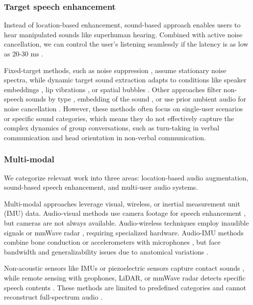 \subsubsection{Target speech enhancement}
Instead of location-based enhancement, sound-based approach enables users to hear manipulated sounds like superhuman hearing. Combined with active noise cancellation, we can control the user's listening seamlessly if the latency is as low as 20-30 ms \cite{stone1999tolerable, gupta2020acoustic}. 

Fixed-target methods, such as noise suppression \cite{wiener1949extrapolation}, assume stationary noise spectra, while dynamic target sound extraction adapts to conditions like speaker embeddings \cite{zmolikova2023neural, veluri2024look}, lip vibrations \cite{liu2021wavoice}, or spatial bubbles \cite{chen2024hearable}. Other approaches filter non-speech sounds by type \cite{veluri2023semantic}, embedding of the sound \cite{liu22w_interspeech}, or use prior ambient audio for noise cancellation \cite{shen2018mute}. 
However, these methods often focus on single-user scenarios or specific sound categories, which means they do not effectively capture the complex dynamics of group conversations, such as turn-taking in verbal communication and head orientation in non-verbal communication.


\subsubsection{Multi-modal}
We categorize relevant work into three areas: location-based audio augmentation, sound-based speech enhancement, and multi-user audio systems.

Multi-modal approaches leverage visual, wireless, or inertial measurement unit (IMU) data. Audio-visual methods use camera footage for speech enhancement \cite{michelsanti2021overview, gao2021visualvoice}, but cameras are not always available. Audio-wireless techniques employ inaudible signals \cite{sun2021ultrase, zhang2021sensing} or mmWave radar \cite{liu2021wavoice, ozturk2021radiomic}, requiring specialized hardware. Audio-IMU methods combine bone conduction or accelerometers with microphones \cite{wang2022fusing, tagliasacchi2020seanet}, but face bandwidth and generalizability issues due to anatomical variations \cite{Inertial63:online}.

Non-acoustic sensors like IMUs or piezoelectric sensors capture contact sounds \cite{maruri2018v, khanna2021jawsense}, while remote sensing with geophones, LiDAR, or mmWave radar detects specific speech contents \cite{han2017pitchln, sami2020spying, li2020vocalprint}. These methods are limited to predefined categories and cannot reconstruct full-spectrum audio \cite{anand2018speechless}.

